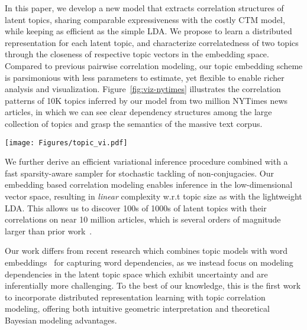 \documentclass[sigconf]{acmart}
\begin{document}
In this paper, we develop a new model that extracts correlation structures of latent topics, sharing comparable expressiveness with the costly CTM model, while keeping as efficient as the simple LDA.
We propose to learn a distributed representation for each latent topic, and characterize correlatedness of two topics through the closeness of respective topic vectors in the embedding space. Compared to previous pairwise correlation modeling, our topic embedding scheme is parsimonious with less parameters to estimate, yet flexible to enable richer analysis and visualization. Figure~\ref{fig:viz-nytimes} illustrates the correlation patterns of 10K topics inferred by our model from two million NYTimes news articles, in which we can see clear dependency structures among the large collection of topics and grasp the semantics of the massive text corpus.
%
\begin{figure*}[!t]
\begin{center}
\texttt{[image: Figures/topic\_vi.pdf]}
\vspace{-2pt}
\caption{Visualization of 10K correlated topics on the NYTimes news corpus. The point cloud shows the 10K topic embeddings where each point represents a latent topic. Smaller distance indicates stronger correlation. We show four sets of topics which are nearby each other in the embedding space, respectively. Each topic is characterized by the top words according to the word distribution. Edge indicates correlation between topics with strength above some threshold.}
\label{fig:viz-nytimes}
\end{center}
\vspace{-4pt}
\end{figure*}

We further derive an efficient variational inference procedure combined with a fast sparsity-aware sampler for stochastic tackling of non-conjugacies. Our embedding based correlation modeling enables inference in the low-dimensional vector space, resulting in {\it linear} complexity w.r.t topic size as with the lightweight LDA. This allows us to discover 100s of 1000s of latent topics with their correlations on near 10 million articles, which is several orders of magnitude larger than prior work~\cite{chen2013scalable,blei2007correlated}.

Our work differs from recent research which combines topic models with word embeddings~\cite{li2016generative,batmanghelich2016nonparametric,das2015gaussian,jiang2016latent} for capturing word dependencies, as we instead focus on modeling dependencies in the latent topic space which exhibit uncertainty and are inferentially more challenging. To the best of our knowledge, this is the first work to incorporate distributed representation learning with topic correlation modeling, offering both intuitive geometric interpretation and theoretical Bayesian modeling advantages.  
\end{document}
